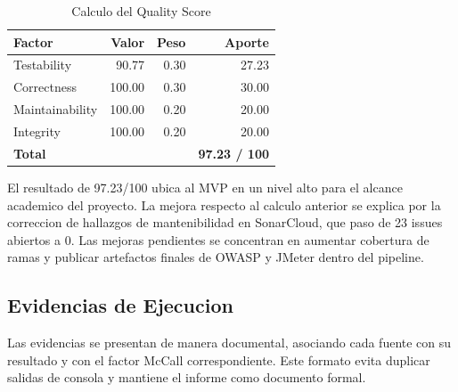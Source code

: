 \documentclass[11pt,oneside]{article}
\begin{document}
\begin{table}[H]
\centering
\small
\caption{Calculo del Quality Score}
\begin{tabular}{lrrr}
\toprule
Factor & Valor & Peso & Aporte\\
\midrule
Testability & 90.77 & 0.30 & 27.23\\
Correctness & 100.00 & 0.30 & 30.00\\
Maintainability & 100.00 & 0.20 & 20.00\\
Integrity & 100.00 & 0.20 & 20.00\\
\midrule
\textbf{Total} & & & \textbf{97.23 / 100}\\
\bottomrule
\end{tabular}
\end{table}

El resultado de 97.23/100 ubica al MVP en un nivel alto para el alcance academico del proyecto. La mejora respecto al calculo anterior se explica por la correccion de hallazgos de mantenibilidad en SonarCloud, que paso de 23 issues abiertos a 0. Las mejoras pendientes se concentran en aumentar cobertura de ramas y publicar artefactos finales de OWASP y JMeter dentro del pipeline.

\subsection{Evidencias de Ejecucion}

Las evidencias se presentan de manera documental, asociando cada fuente con su resultado y con el factor McCall correspondiente. Este formato evita duplicar salidas de consola y mantiene el informe como documento formal.
\end{document}

